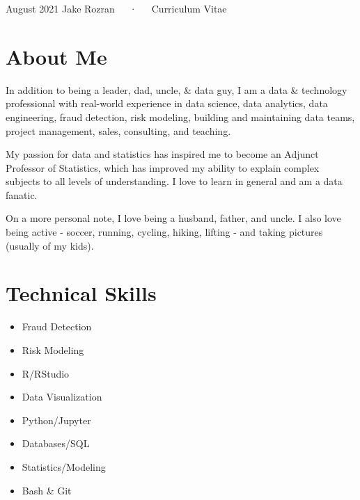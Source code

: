 \documentclass[11pt, a4paper]{awesome-cv}
\providecommand{\tightlist}{%
	\setlength{\itemsep}{0pt}\setlength{\parskip}{0pt}}
\begin{document}
\makecvheader

\makecvfooter
  {August 2021}
    {Jake Rozran~~~·~~~Curriculum Vitae}
  {\thepage}





\hypertarget{about-me}{%
\section{About Me}\label{about-me}}

In addition to being a leader, dad, uncle, \& data guy, I am a data \&
technology professional with real-world experience in data science, data
analytics, data engineering, fraud detection, risk modeling, building
and maintaining data teams, project management, sales, consulting, and
teaching.

My passion for data and statistics has inspired me to become an Adjunct
Professor of Statistics, which has improved my ability to explain
complex subjects to all levels of understanding. I love to learn in
general and am a data fanatic.

On a more personal note, I love being a husband, father, and uncle. I
also love being active - soccer, running, cycling, hiking, lifting - and
taking pictures (usually of my kids).

\hypertarget{technical-skills}{%
\section{Technical Skills}\label{technical-skills}}

\btwocol

\begin{itemize}
\tightlist
\item
  Fraud Detection
\item
  Risk Modeling
\item
  R/RStudio
\item
  Data Visualization
\item
  Python/Jupyter
\item
  Databases/SQL
\item
  Statistics/Modeling
\item
  Bash \& Git
\end{itemize}
\end{document}
